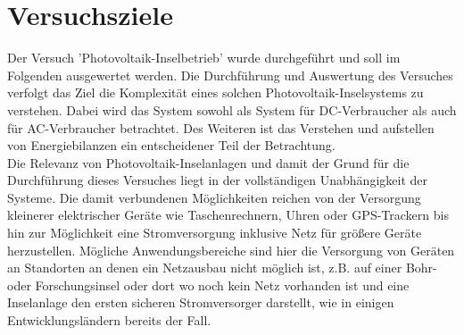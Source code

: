 \section{Versuchsziele}
Der Versuch 'Photovoltaik-Inselbetrieb' wurde durchgeführt und
 soll im Folgenden ausgewertet werden. Die Durchführung und Auswertung des 
 Versuches verfolgt das Ziel die Komplexität eines solchen 
 Photovoltaik-Inselsystems zu verstehen. Dabei wird das System sowohl als System 
 für DC-Verbraucher als auch für AC-Verbraucher betrachtet. Des Weiteren ist das
 Verstehen und aufstellen von Energiebilanzen ein entscheidener Teil der Betrachtung.\\
 Die Relevanz von Photovoltaik-Inselanlagen und damit der Grund für die Durchführung
 dieses Versuches liegt in der vollständigen Unabhängigkeit der Systeme. Die damit
 verbundenen Möglichkeiten reichen von der Versorgung kleinerer elektrischer Geräte
 wie Taschenrechnern, Uhren oder GPS-Trackern bis hin zur Möglichkeit eine Stromversorgung
 inklusive Netz für größere Geräte herzustellen.
 Mögliche Anwendungsbereiche sind hier die Versorgung von Geräten an Standorten
 an denen ein Netzausbau nicht möglich ist, z.B. auf einer Bohr- oder Forschungsinsel
 oder dort wo noch kein Netz vorhanden ist und eine Inselanlage den ersten sicheren
 Stromversorger darstellt, wie in einigen Entwicklungsländern bereits der Fall.
